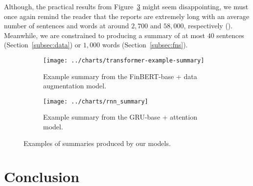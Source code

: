 Although, the practical results from Figure~\ref{fig:summary_examples} might seem disappointing, we must once again remind the reader that the reports are extremely
long with an average number of sentences and words at around $2,700$ and $58,000$, respectively (\cite{litvak-vanetik-2021-summarization}).
Meanwhile, we are constrained to producing a summary of at most $40$ sentences (Section~\ref{subsec:data}) or $1,000$ words (Section~\ref{subsec:fns}).

\begin{figure}[ht]
    \centering
    \begin{subfigure}[t]{0.49\textwidth}
        \centering
        \texttt{[image: ../charts/transformer-example-summary]}
        \caption{Example summary from the FinBERT-base + data augmentation model.}
        \label{fig:finbert_summary}
    \end{subfigure}
    \hfill
    \begin{subfigure}[t]{0.49\textwidth}
        \centering
        \texttt{[image: ../charts/rnn\_summary]}
        \caption{Example summary from the GRU-base + attention model.}
        \label{fig:rnn_summary}
    \end{subfigure}
    \caption{Examples of summaries produced by our models.}
    \label{fig:summary_examples}
\end{figure}

\newpage

\section{Conclusion}\label{sec:conclusion}
